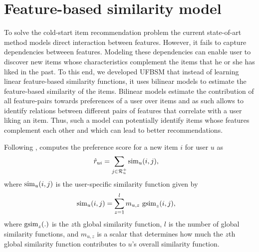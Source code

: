 \section{Feature-based similarity model} \label{ch:bilinear:method}

To solve the cold-start item recommendation problem the current state-of-art 
method \CFLIN models direct interaction between features. However,
it fails to capture dependencies betweeen features. Modeling these dependencies
can enable user to discover new items whose characteristics complement the items
that he or she has liked in the past. To this end, we developed UFBSM that
instead of learning linear feature-based similarity functions, it uses bilinear
models to estimate the feature-based similarity of the items. Bilinear models
estimate the contribution of all feature-pairs towards preferences of a user
over items and as such allows \CF to identify relations between different pairs
of features that correlate with a user liking an item. Thus, such a model can
potentially identify items whose features complement each other and which can
lead to better recommendations.


Following \CFLIN, \CF computes the preference score for a new item $i$ for user
$u$ as
%
\begin{equation} \label{est_Eq}
  \begin{split}
    \hat{r}_{ui} 	& = \sum_{j\in \mathcal{R}_u^+} \operatorname{sim}_{u}(i,j), 
  \end{split}
\end{equation}
%
\noindent where $\operatorname{sim}_u(i,j)$ is the user-specific similarity function given by
%
\begin{equation} \label{userSpecificSim_Eq}
  \begin{split}
    \operatorname{sim}_{u}(i,j)  & = \sum_{z=1}^{l} m_{u,z} \, \operatorname{gsim}_z(i,j), 
  \end{split}
\end{equation}
%
\noindent where $\operatorname{gsim}_z(.)$ is the $z$th global similarity function, $l$ is the number
of global similarity functions,  and $m_{u,z}$ is a scalar that determines how
much the $z$th global similarity function contributes to $u$'s overall
similarity function. 

